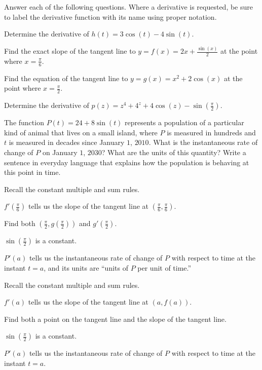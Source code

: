 \begin{activity} \label{A:2.4.Act10}  Answer each of the following questions.  Where a derivative is requested, be sure to label the derivative function with its name using proper notation.
\ba
	\item Determine the derivative of $h(t) = 3\cos(t) - 4\sin(t)$.
	\item Find the exact slope of the tangent line to $y = f(x) = 2x + \frac{\sin(x)}{2}$ at the point where $x = \frac{\pi}{6}$.
	\item Find the equation of the tangent line to $y = g(x) = x^2 + 2\cos(x)$ at the point where $x = \frac{\pi}{2}$.
	\item Determine the derivative of $p(z) = z^4 + 4^z + 4\cos(z) - \sin(\frac{\pi}{2})$.
	\item The function $P(t) = 24 + 8\sin(t)$ represents a population of a particular kind of animal that lives on a small island, where $P$ is measured in hundreds and $t$ is measured in decades since January $1$, $2010$.  What is the instantaneous rate of change of $P$ on January $1$, $2030$?  What are the units of this quantity?  Write a sentence in everyday language that explains how the population is behaving at this point in time.
\ea

\end{activity}
\begin{smallhint}
\ba
	\item Recall the constant multiple and sum rules.
	\item $f'(\frac{\pi}{6})$ tells us the slope of the tangent line at $(\frac{\pi}{6},\frac{\pi}{6})$.
	\item Find both $(\frac{\pi}{2}, g(\frac{\pi}{2}))$ and $g'(\frac{\pi}{2})$.
	\item $\sin(\frac{\pi}{2})$ is a constant.
	\item $P'(a)$ tells us the instantaneous rate of change of $P$ with respect to time at the instant $t = a$, and its units are ``units of $P$ per unit of time.''
\ea
\end{smallhint}
\begin{bighint}
\ba
	\item Recall the constant multiple and sum rules.
	\item $f'(a)$ tells us the slope of the tangent line at $(a,f(a))$.
	\item Find both a point on the tangent line and the slope of the tangent line.
	\item $\sin(\frac{\pi}{2})$ is a constant.
	\item $P'(a)$ tells us the instantaneous rate of change of $P$ with respect to time at the instant $t = a$.
\ea
\end{bighint}
